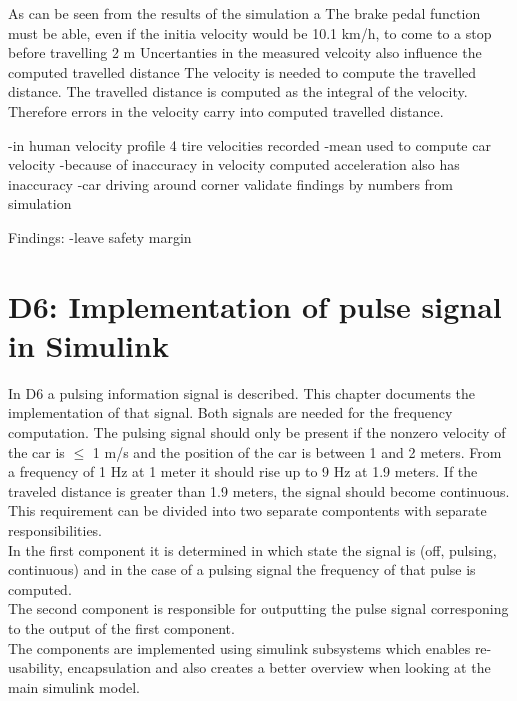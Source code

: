 As can be seen from the results of the simulation a 
The brake pedal function must be able, even if the initia velocity would be 10.1 km/h, to come to a stop before travelling 2 m
Uncertanties in the measured velcoity also influence the computed travelled distance
The velocity is needed to compute the travelled distance. The travelled distance is computed as the integral of the velocity. Therefore errors in the velocity carry into computed travelled distance.


-in human velocity profile 4 tire velocities recorded
-mean used to compute car velocity
-because of inaccuracy in velocity computed acceleration also has inaccuracy
-car driving around corner
validate findings by numbers from simulation

Findings:
-leave safety margin

\chapter{D6: Implementation of pulse signal in Simulink}\label{cha:D6}

In D6 a pulsing information signal is described. This chapter documents the implementation of that signal.
Both signals are needed for the frequency computation.
The pulsing signal should only be present if the nonzero velocity of the car is $\leq$ 1 m/s and the position of the car is between 1 and 2 meters. From a frequency of 1 Hz at 1 meter it should rise up to 9 Hz at 1.9 meters. If the traveled distance is greater than 1.9 meters, the signal should become continuous.\\
This requirement can be divided into two separate compontents with separate responsibilities.\\
In the first component it is determined in which state the signal is (off, pulsing, continuous) and in the case of a pulsing signal the frequency of that pulse is computed.\\
The second component is responsible for outputting the pulse signal corresponing to the output of the first component.\\
The components are implemented using simulink subsystems which enables re-usability, encapsulation and also creates a better overview when looking at the main simulink model.\\
